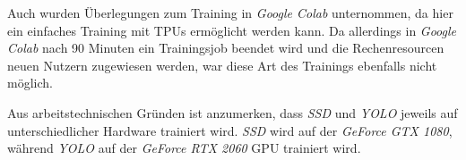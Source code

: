 Auch wurden Überlegungen zum Training in \textit{Google Colab} unternommen, da hier ein einfaches Training mit TPUs ermöglicht werden kann. Da allerdings in \textit{Google Colab} nach 90 Minuten ein Trainingsjob beendet wird und die Rechenresourcen neuen Nutzern zugewiesen werden, war diese Art des Trainings ebenfalls nicht möglich. 

Aus arbeitstechnischen Gründen ist anzumerken, dass \textit{SSD} und \textit{YOLO} jeweils auf unterschiedlicher Hardware trainiert wird. \textit{SSD} wird auf der \textit{GeForce GTX 1080}, während \textit{YOLO} auf der \textit{GeForce RTX 2060} GPU trainiert wird.
